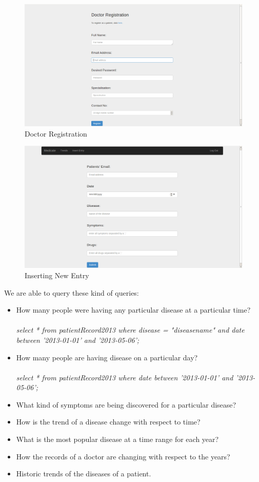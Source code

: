 \documentclass{article}
\begin{document}
\begin{figure}[!htbp]
	\centering
	\includegraphics[width=0.8\columnwidth]{doctor_reg.png}
	\caption{Doctor Registration}
	\label{DR}
\end{figure}

\begin{figure}[!htbp]
	\centering
	\includegraphics[width=0.8\columnwidth]{entry.png}
	\caption{Inserting New Entry}
	\label{entry}
\end{figure}

\newpage
We are able to query these kind of queries:
\begin{itemize}
\item How many people were having any particular disease at a particular time?\\\\
\textit{select * from patientRecord2013 where disease = "diseasename" and date between '2013-01-01' and '2013-05-06';}
\item How many people are having disease on a particular day?\\\\
\textit{select * from patientRecord2013 where date between '2013-01-01' and '2013-05-06';}
\item What kind of symptoms are being discovered for a particular disease?
\item How is the trend of a disease change with respect to time?
\item What is the most popular disease at a time range for each year?
\item How the records of a doctor are changing with respect to the years?
\item Historic trends of the diseases of a patient.
\end{itemize}
\end{document}
